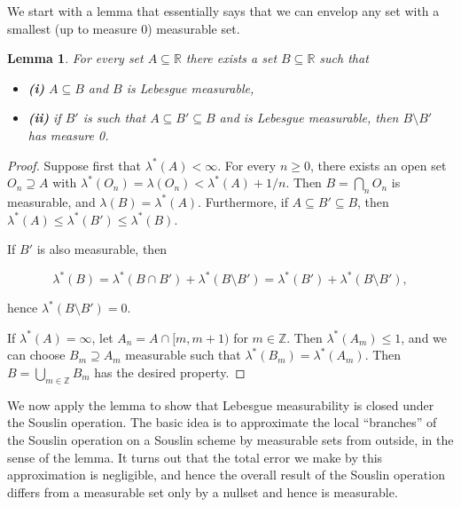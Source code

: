 \documentclass{article}
\newcommand{\Real}{\mathbb{R}}
\newcommand{\Integer}{\mathbb{Z}}
\newtheorem{lemma}[theorem]{Lemma}
\begin{document}
We start with a lemma that essentially says that we can envelop any
set with a smallest (up to measure 0) measurable set.

\begin{lemma}\label{lem-approx-measurable}For every set $A \subseteq \Real$ there exists a set $B \subseteq \Real$ such that

\begin{itemize}
\item \textbf{(i)} $A \subseteq B$ and $B$  is  Lebesgue measurable,
\item \textbf{(ii)} if $B'$ is such that $A \subseteq B' \subseteq B$  and is Lebesgue measurable, then $B\setminus B'$ has measure 0.
\end{itemize}

\end{lemma}\begin{proof}Suppose first that $\lambda^*(A) < \infty$. For every $n \geq 0$, there exists an open set $O_n \supseteq A$ with $\lambda^*(O_n) = \lambda(O_n) < \lambda^*(A) + 1/n$. Then $B = \bigcap_n O_n$ is measurable, and $\lambda(B) = \lambda^*(A)$. Furthermore, if $A \subseteq B' \subseteq B$, then $\lambda^*(A) \leq  \lambda^*(B') \leq \lambda^*(B)$.

If $B'$ is also measurable, then

\begin{equation}
\lambda^*(B) = \lambda^*(B \cap B') + \lambda^*(B \setminus B') = \lambda^*(B') + \lambda^*(B \setminus B'),
\end{equation}

hence $\lambda^*(B \setminus B') = 0$.

If $\lambda^*(A) = \infty$, let $A_n = A \cap [m,m+1)$ for $m \in \Integer$. Then $\lambda^*(A_m) \leq 1$, and we can choose $B_m \supseteq A_m$ measurable such that $\lambda^*(B_m) = \lambda^*(A_m)$. Then $B = \bigcup_{m \in \Integer} B_m$ has the desired property.

\end{proof}We now apply the lemma to show that Lebesgue measurability is closed
under the Souslin operation. The basic idea is to approximate the local
``branches'' of the Souslin operation on a Souslin scheme by measurable
sets from outside, in the sense of the lemma.
It turns out that the total error we make by this approximation is
negligible, and hence the overall result of the Souslin operation
differs from a measurable set only by a nullset and hence is
measurable.
\end{document}
